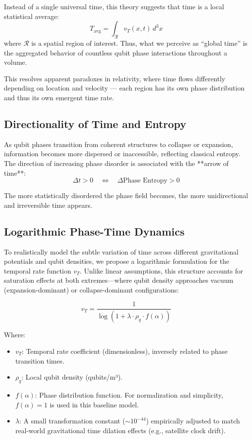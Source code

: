 \documentclass[12pt]{report} %
\begin{document}
Instead of a single universal time, this theory suggests that time is a local statistical average:
\[
T_{\text{avg}} = \int_{\mathcal{R}} v_T(x, t) \, d^3x
\]
where \( \mathcal{R} \) is a spatial region of interest. Thus, what we perceive as “global time” is the aggregated behavior of countless qubit phase interactions throughout a volume.

This resolves apparent paradoxes in relativity, where time flows differently depending on location and velocity — each region has its own phase distribution and thus its own emergent time rate.

\subsection{Directionality of Time and Entropy}

As qubit phases transition from coherent structures to collapse or expansion, information becomes more dispersed or inaccessible, reflecting classical entropy. The direction of increasing phase disorder is associated with the **arrow of time**:
\[
\Delta t > 0 \quad \Leftrightarrow \quad \Delta \text{Phase Entropy} > 0
\]

The more statistically disordered the phase field becomes, the more unidirectional and irreversible time appears.




\subsection{Logarithmic Phase-Time Dynamics}

To realistically model the subtle variation of time across different gravitational potentials and qubit densities, we propose a logarithmic formulation for the temporal rate function \(v_T\). Unlike linear assumptions, this structure accounts for saturation effects at both extremes—where qubit density approaches vacuum (expansion-dominant) or collapse-dominant configurations:

\[
v_T = \frac{1}{\log\left(1 + \lambda \cdot \rho_q \cdot f(\alpha)\right)}
\]

Where:
\begin{itemize}
  \item \(v_T\): Temporal rate coefficient (dimensionless), inversely related to phase transition times.
  \item \(\rho_q\): Local qubit density (qubits/m³).
  \item \(f(\alpha)\): Phase distribution function. For normalization and simplicity, \(f(\alpha) = 1\) is used in this baseline model.
  \item \(\lambda\): A small transformation constant (\(\sim 10^{-44}\)) empirically adjusted to match real-world gravitational time dilation effects (e.g., satellite clock drift).
\end{itemize}
\end{document}
